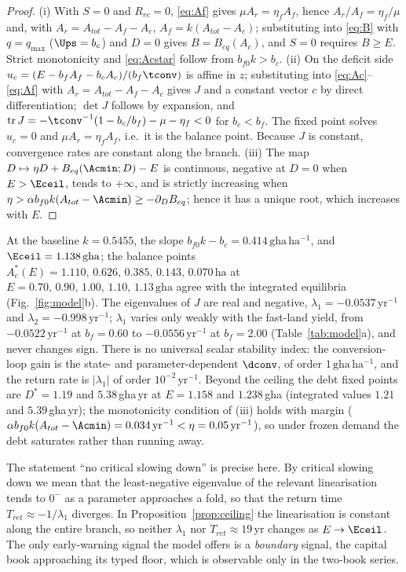 \begin{proof}
(i) With $S=0$ and $R_{rc}=0$, \eqref{eq:Af} gives $\mu A_r=\eta_fA_f$, hence $A_r/A_f=\eta_f/\mu$ and, with $A_r=A_{tot}-A_f-A_c$, $A_f=k(A_{tot}-A_c)$; substituting into \eqref{eq:B} with $q=q_{\max}$ ($\Ups=b_c$) and $D=0$ gives $B=B_{eq}(A_c)$, and $S=0$ requires $B\ge E$. Strict monotonicity and \eqref{eq:Acstar} follow from $b_{f0}k>b_c$. (ii) On the deficit side $u_c=(E-b_fA_f-b_cA_c)/(b_f\tconv)$ is affine in $z$; substituting into \eqref{eq:Ac}--\eqref{eq:Af} with $A_r=A_{tot}-A_f-A_c$ gives $J$ and a constant vector $c$ by direct differentiation; $\det J$ follows by expansion, and $\operatorname{tr}J=-\tconv^{-1}(1-b_c/b_f)-\mu-\eta_f<0$ for $b_c<b_f$. The fixed point solves $u_c=0$ and $\mu A_r=\eta_fA_f$, i.e.\ it is the balance point. Because $J$ is constant, convergence rates are constant along the branch. (iii) The map $D\mapsto\eta D+B_{eq}(\Acmin;D)-E$ is continuous, negative at $D=0$ when $E>\Eceil$, tends to $+\infty$, and is strictly increasing when $\eta>\alpha b_{f0}k(A_{tot}-\Acmin)\ge-\partial_DB_{eq}$; hence it has a unique root, which increases with $E$.
\end{proof}

At the baseline $k=0.5455$, the slope $b_{f0}k-b_c=0.414\,\mathrm{gha\,ha^{-1}}$, and $\Eceil=1.138\,\mathrm{gha}$; the balance points $A_c^*(E)=1.110,\,0.626,\,0.385,\,0.143,\,0.070\,\mathrm{ha}$ at $E=0.70,\,0.90,\,1.00,\,1.10,\,1.13\,\mathrm{gha}$ agree with the integrated equilibria (Fig.~\ref{fig:model}b). The eigenvalues of $J$ are real and negative, $\lambda_1=-0.0537\,\mathrm{yr}^{-1}$ and $\lambda_2=-0.998\,\mathrm{yr}^{-1}$; $\lambda_1$ varies only weakly with the fast-land yield, from $-0.0522\,\mathrm{yr}^{-1}$ at $b_f=0.60$ to $-0.0556\,\mathrm{yr}^{-1}$ at $b_f=2.00$ (Table~\ref{tab:model}a), and never changes sign. There is no universal scalar stability index: the conversion-loop gain is the state- and parameter-dependent $\dconv$, of order $1\,\mathrm{gha\,ha^{-1}}$, and the return rate is $|\lambda_1|$ of order $10^{-2}\,\mathrm{yr}^{-1}$. Beyond the ceiling the debt fixed points are $D^*=1.19$ and $5.38$\,gha\,yr at $E=1.158$ and $1.238$\,gha (integrated values $1.21$ and $5.39$\,gha\,yr); the monotonicity condition of (iii) holds with margin ($\alpha b_{f0}k(A_{tot}-\Acmin)=0.034\,\mathrm{yr}^{-1}<\eta=0.05\,\mathrm{yr}^{-1}$), so under frozen demand the debt saturates rather than running away.

The statement ``no critical slowing down'' is precise here. By critical slowing down we mean that the least-negative eigenvalue of the relevant linearisation tends to $0^-$ as a parameter approaches a fold, so that the return time $T_{ret}\approx-1/\lambda_1$ diverges. In Proposition~\ref{prop:ceiling} the linearisation is constant along the entire branch, so neither $\lambda_1$ nor $T_{ret}\approx19$\,yr changes as $E\to\Eceil$. The only early-warning signal the model offers is a \emph{boundary} signal, the capital book approaching its typed floor, which is observable only in the two-book series.

